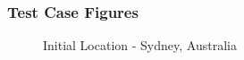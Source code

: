 ﻿\documentclass{article}
\begin{document}
\subsubsection{Test Case Figures}
\begin{figure}[H]
    \centering
    \begin{center}
    \end{center}
    \caption{Initial Location - Sydney, Australia}
    \label{fig:my_label}
\end{figure}
\end{document}
